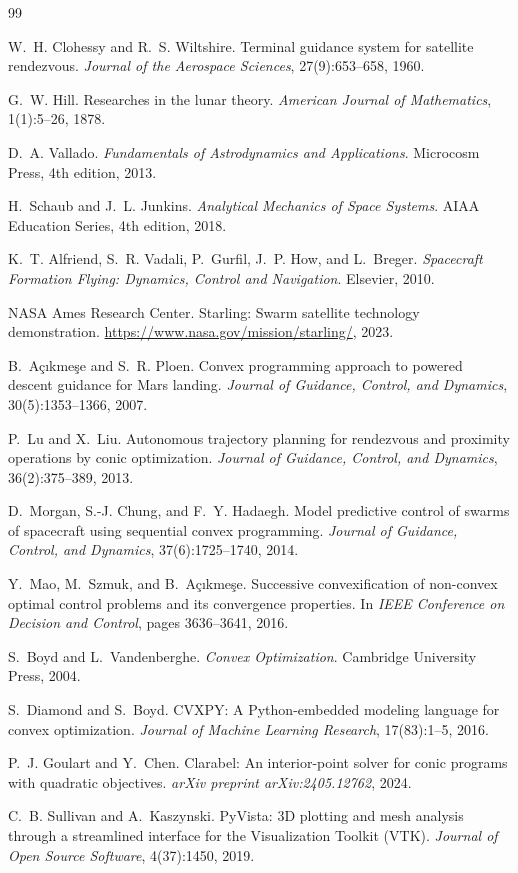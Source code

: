 \documentclass[10pt,twocolumn,letterpaper]{article}
\begin{document}
\balance
{\small
\begin{thebibliography}{99}

W.~H. Clohessy and R.~S. Wiltshire.
Terminal guidance system for satellite rendezvous.
\emph{Journal of the Aerospace Sciences}, 27(9):653--658, 1960.

G.~W. Hill.
Researches in the lunar theory.
\emph{American Journal of Mathematics}, 1(1):5--26, 1878.

D.~A. Vallado.
\emph{Fundamentals of Astrodynamics and Applications}.
Microcosm Press, 4th edition, 2013.

H.~Schaub and J.~L. Junkins.
\emph{Analytical Mechanics of Space Systems}.
AIAA Education Series, 4th edition, 2018.

K.~T. Alfriend, S.~R. Vadali, P.~Gurfil, J.~P. How, and L.~Breger.
\emph{Spacecraft Formation Flying: Dynamics, Control and Navigation}.
Elsevier, 2010.

NASA Ames Research Center.
Starling: Swarm satellite technology demonstration.
\url{https://www.nasa.gov/mission/starling/}, 2023.

B.~A\c{c}{\i}kme\c{s}e and S.~R. Ploen.
Convex programming approach to powered descent guidance for Mars landing.
\emph{Journal of Guidance, Control, and Dynamics}, 30(5):1353--1366, 2007.

P.~Lu and X.~Liu.
Autonomous trajectory planning for rendezvous and proximity operations by
conic optimization.
\emph{Journal of Guidance, Control, and Dynamics}, 36(2):375--389, 2013.

D.~Morgan, S.-J. Chung, and F.~Y. Hadaegh.
Model predictive control of swarms of spacecraft using sequential convex
programming.
\emph{Journal of Guidance, Control, and Dynamics}, 37(6):1725--1740, 2014.

Y.~Mao, M.~Szmuk, and B.~A\c{c}{\i}kme\c{s}e.
Successive convexification of non-convex optimal control problems and its
convergence properties.
In \emph{IEEE Conference on Decision and Control}, pages 3636--3641, 2016.

S.~Boyd and L.~Vandenberghe.
\emph{Convex Optimization}.
Cambridge University Press, 2004.

S.~Diamond and S.~Boyd.
{CVXPY}: A {Python}-embedded modeling language for convex optimization.
\emph{Journal of Machine Learning Research}, 17(83):1--5, 2016.

P.~J. Goulart and Y.~Chen.
Clarabel: An interior-point solver for conic programs with quadratic
objectives.
\emph{arXiv preprint arXiv:2405.12762}, 2024.

C.~B. Sullivan and A.~Kaszynski.
{PyVista}: 3D plotting and mesh analysis through a streamlined interface for
the Visualization Toolkit ({VTK}).
\emph{Journal of Open Source Software}, 4(37):1450, 2019.

\end{thebibliography}
}
\end{document}
